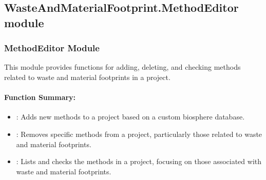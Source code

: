 \documentclass[letterpaper,10pt,english]{sphinxmanual}
\begin{document}
\subsection{WasteAndMaterialFootprint.MethodEditor module}
\label{\detokenize{WMFootprint_api:module-WasteAndMaterialFootprint.MethodEditor}}\label{\detokenize{WMFootprint_api:wasteandmaterialfootprint-methodeditor-module}}

\subsubsection{MethodEditor Module}
\label{\detokenize{WMFootprint_api:methodeditor-module}}
\sphinxAtStartPar
This module provides functions for adding, deleting, and checking methods related to waste and material footprints in a project.


\paragraph{Function Summary:}
\label{\detokenize{WMFootprint_api:function-summary}}\begin{itemize}
\item {} 
\sphinxAtStartPar
{}: Adds new methods to a project based on a custom biosphere database.

\item {} 
\sphinxAtStartPar
{}: Removes specific methods from a project, particularly those related to waste and material footprints.

\item {} 
\sphinxAtStartPar
{}: Lists and checks the methods in a project, focusing on those associated with waste and material footprints.

\end{itemize}
\end{document}
